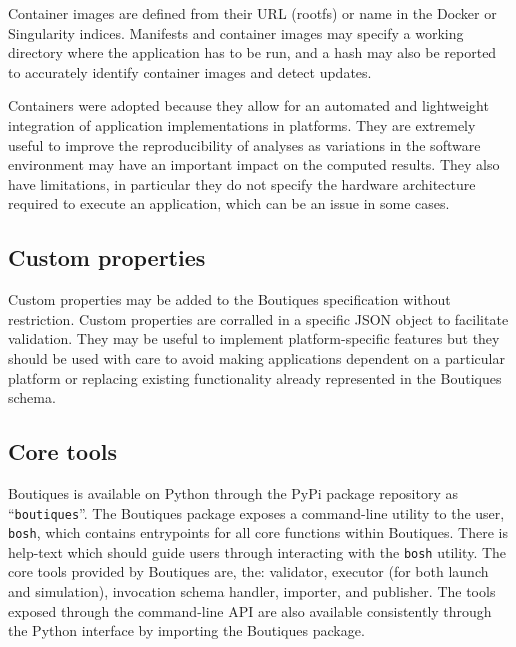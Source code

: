 \documentclass{article}
\newcommand{\boutiques}{Boutiques\xspace}
\begin{document}
Container images are defined from their URL (rootfs) or name in the
Docker or Singularity indices. Manifests and container images may specify a
working directory where the application has to be run, and a hash may also be
reported to accurately identify container images and detect updates.

Containers were adopted because they allow for an automated and
lightweight integration of application implementations in
platforms. They are extremely useful to improve the reproducibility of
analyses as variations in the software environment may have an
important impact on the computed results. They also have limitations,
in particular they do not specify the hardware architecture required
to execute an application, which can be an issue in some cases.


\subsection{Custom properties}

Custom properties may be added to the Boutiques specification without
restriction. Custom properties are corralled in a specific JSON object
to facilitate validation. They may be useful to implement
platform-specific features but they should be used with care to avoid
making applications dependent on a particular platform or replacing
existing functionality already represented in the \boutiques schema.

\subsection{Core tools} 

\boutiques is available on Python through the PyPi package repository as
``\texttt{boutiques}''. The \boutiques package exposes a command-line
utility to the user, \texttt{bosh}, which contains entrypoints for all
core functions within \boutiques. There is help-text which should guide
users through interacting with the \texttt{bosh} utility. The core tools
provided by \boutiques are, the: validator, executor (for both launch and
simulation), invocation schema handler, importer, and publisher. The tools
exposed through the command-line API are also available consistently through
the Python interface by importing the \boutiques package.
\end{document}
